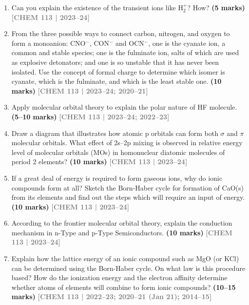 \documentclass[12pt,a3paper]{article}
\newcommand{\yr}[1]{\hfill\textcolor{gray}{\small\textbf{[#1]}}}
\newcommand{\mk}[1]{\textcolor{orange!70!black}{\small\textbf{(#1 marks)}}}
\begin{document}
\begin{enumerate}
\item Can you explain the existence of the transient ions like H$_2^+$? How? \mk{5}
\yr{CHEM 113 | 2023--24}



\item From the three possible ways to connect carbon, nitrogen, and oxygen to form a monoanion: CNO$^-$, CON$^-$ and OCN$^-$, one is the cyanate ion, a common and stable species; one is the fulminate ion, salts of which are used as explosive detonators; and one is so unstable that it has never been isolated. Use the concept of formal charge to determine which isomer is cyanate, which is the fulminate, and which is the least stable one. \mk{10}
\yr{CHEM 113 | 2023--24; 2020--21}



\item Apply molecular orbital theory to explain the polar nature of HF molecule. \mk{5--10}
\yr{CHEM 113 | 2023--24; 2022--23}




\item Draw a diagram that illustrates how atomic p orbitals can form both $\sigma$ and $\pi$ molecular orbitals. What effect of 2s--2p mixing is observed in relative energy level of molecular orbitals (MOs) in homonuclear diatomic molecules of period 2 elements? \mk{10}
\yr{CHEM 113 | 2023--24}



\item If a great deal of energy is required to form gaseous ions, why do ionic compounds form at all? Sketch the Born-Haber cycle for formation of CaO(s) from its elements and find out the steps which will require an input of energy. \mk{10}
\yr{CHEM 113 | 2023--24}



\item According to the frontier molecular orbital theory, explain the conduction mechanism in n-Type and p-Type Semiconductors. \mk{10}
\yr{CHEM 113 | 2023--24}



\item Explain how the lattice energy of an ionic compound such as MgO (or KCl) can be determined using the Born-Haber cycle. On what law is this procedure based? How do the ionization energy and the electron affinity determine whether atoms of elements will combine to form ionic compounds? \mk{10--15}
\yr{CHEM 113 | 2022--23; 2020--21 (Jan 21); 2014--15}




\end{enumerate}
\end{document}
